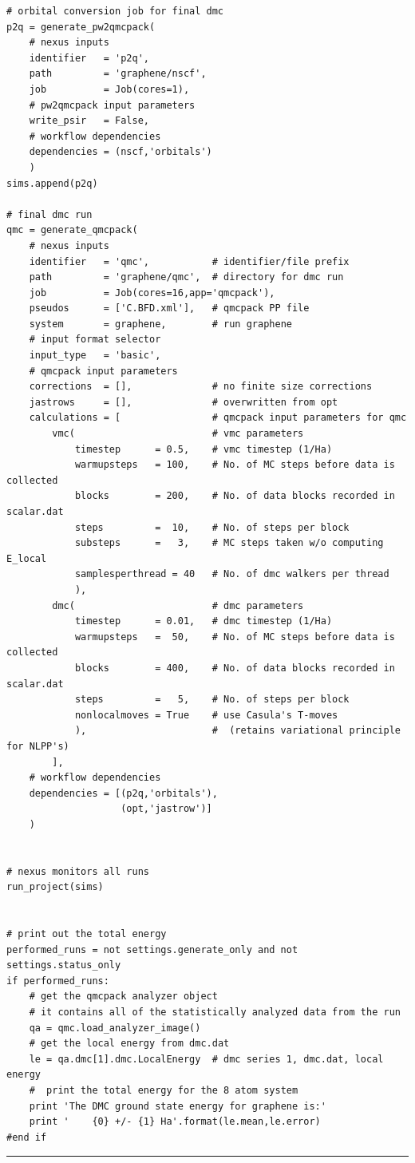 \documentclass[oneside,11pt]{memoir}
\numberwithin{equation}{section}
\newcommand{\HRule}{\rule{\linewidth}{0.5mm}}
\begin{document}
\begin{verbatim}
# orbital conversion job for final dmc
p2q = generate_pw2qmcpack(
    # nexus inputs
    identifier   = 'p2q',
    path         = 'graphene/nscf',
    job          = Job(cores=1),
    # pw2qmcpack input parameters
    write_psir   = False,
    # workflow dependencies
    dependencies = (nscf,'orbitals')
    )
sims.append(p2q)
    
# final dmc run
qmc = generate_qmcpack( 
    # nexus inputs
    identifier   = 'qmc',           # identifier/file prefix       
    path         = 'graphene/qmc',  # directory for dmc run       
    job          = Job(cores=16,app='qmcpack'),
    pseudos      = ['C.BFD.xml'],   # qmcpack PP file
    system       = graphene,        # run graphene
    # input format selector                                      
    input_type   = 'basic',
    # qmcpack input parameters
    corrections  = [],              # no finite size corrections
    jastrows     = [],              # overwritten from opt
    calculations = [                # qmcpack input parameters for qmc
        vmc(                        # vmc parameters 
            timestep      = 0.5,    # vmc timestep (1/Ha)
            warmupsteps   = 100,    # No. of MC steps before data is collected
            blocks        = 200,    # No. of data blocks recorded in scalar.dat
            steps         =  10,    # No. of steps per block
            substeps      =   3,    # MC steps taken w/o computing E_local
            samplesperthread = 40   # No. of dmc walkers per thread
            ),                      
        dmc(                        # dmc parameters
            timestep      = 0.01,   # dmc timestep (1/Ha)
            warmupsteps   =  50,    # No. of MC steps before data is collected
            blocks        = 400,    # No. of data blocks recorded in scalar.dat
            steps         =   5,    # No. of steps per block
            nonlocalmoves = True    # use Casula's T-moves
            ),                      #  (retains variational principle for NLPP's)
        ],
    # workflow dependencies
    dependencies = [(p2q,'orbitals'),
                    (opt,'jastrow')]
    )


# nexus monitors all runs
run_project(sims)


# print out the total energy
performed_runs = not settings.generate_only and not settings.status_only
if performed_runs:
    # get the qmcpack analyzer object
    # it contains all of the statistically analyzed data from the run
    qa = qmc.load_analyzer_image()
    # get the local energy from dmc.dat
    le = qa.dmc[1].dmc.LocalEnergy  # dmc series 1, dmc.dat, local energy
    #  print the total energy for the 8 atom system
    print 'The DMC ground state energy for graphene is:'
    print '    {0} +/- {1} Ha'.format(le.mean,le.error)
#end if
\end{verbatim}
\HRule
\end{document}
